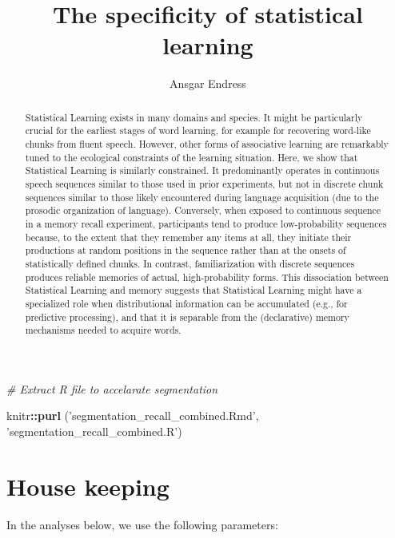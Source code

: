 \documentclass[]{article}
\title{The specificity of statistical learning}
\author{Ansgar Endress}
\date{}
\newenvironment{Shaded}{\begin{snugshade}}{\end{snugshade}}
\newcommand{\KeywordTok}[1]{\textcolor[rgb]{0.13,0.29,0.53}{\textbf{#1}}}
\newcommand{\StringTok}[1]{\textcolor[rgb]{0.31,0.60,0.02}{#1}}
\newcommand{\CommentTok}[1]{\textcolor[rgb]{0.56,0.35,0.01}{\textit{#1}}}
\newcommand{\OperatorTok}[1]{\textcolor[rgb]{0.81,0.36,0.00}{\textbf{#1}}}
\newcommand{\NormalTok}[1]{#1}
\begin{document}
\maketitle
\begin{abstract}
Statistical Learning exists in many domains and species. It might be
particularly crucial for the earliest stages of word learning, for
example for recovering word-like chunks from fluent speech. However,
other forms of associative learning are remarkably tuned to the
ecological constraints of the learning situation. Here, we show that
Statistical Learning is similarly constrained. It predominantly operates
in continuous speech sequences similar to those used in prior
experiments, but not in discrete chunk sequences similar to those likely
encountered during language acquisition (due to the prosodic
organization of language). Conversely, when exposed to continuous
sequence in a memory recall experiment, participants tend to produce
low-probability sequences because, to the extent that they remember any
items at all, they initiate their productions at random positions in the
sequence rather than at the onsets of statistically defined chunks. In
contrast, familiarization with discrete sequences produces reliable
memories of actual, high-probability forms. This dissociation between
Statistical Learning and memory suggests that Statistical Learning might
have a specialized role when distributional information can be
accumulated (e.g., for predictive processing), and that it is separable
from the (declarative) memory mechanisms needed to acquire words.
\end{abstract}

{
\setcounter{tocdepth}{5}
\tableofcontents
}
\begin{Shaded}
\begin{Highlighting}[]
\CommentTok{# Extract R file to accelarate segmentation}

\NormalTok{knitr}\OperatorTok{::}\KeywordTok{purl}\NormalTok{ (}\StringTok{'segmentation_recall_combined.Rmd'}\NormalTok{, }
      \StringTok{'segmentation_recall_combined.R'}\NormalTok{)}
\end{Highlighting}
\end{Shaded}

\section{House keeping}\label{house-keeping}

In the analyses below, we use the following parameters:
\end{document}

